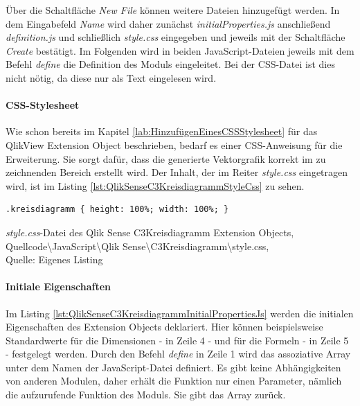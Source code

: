 Über die Schaltfläche \textit{New File} können weitere Dateien hinzugefügt werden. In dem Eingabefeld \textit{Name} wird daher zunächst \textit{initialProperties.js} anschließend \textit{definition.js} und schließlich \textit{style.css} eingegeben und jeweils mit der Schaltfläche \textit{Create} bestätigt. Im Folgenden wird in beiden JavaScript-Dateien jeweils mit dem Befehl \textit{define} die Definition des Moduls eingeleitet. Bei der CSS-Datei ist dies nicht nötig, da diese nur als Text eingelesen wird.

\paragraph{CSS-Stylesheet}

Wie schon bereits im Kapitel \ref{lab:HinzufügenEinesCSSStylesheet} für das QlikView Extension Object beschrieben, bedarf es einer CSS-Anweisung für die Erweiterung. Sie sorgt dafür, dass die generierte Vektorgrafik korrekt im zu zeichnenden Bereich erstellt wird. Der Inhalt, der im Reiter \textit{style.css} eingetragen wird, ist im Listing \ref{lst:QlikSenseC3KreisdiagrammStyleCss} zu sehen.

\begin{listing}[htbp]
\begin{verbatim}
.kreisdiagramm { height: 100%; width: 100%; }
\end{verbatim}
\caption[\textit{style.css}-Datei des Qlik Sense C3Kreisdiagramm Extension Objects]{\textit{style.css}-Datei des Qlik Sense C3Kreisdiagramm Extension Objects, \\Quellcode\textbackslash{}JavaScript\textbackslash{}Qlik Sense\textbackslash{}C3Kreisdiagramm\textbackslash{}style.css, \\Quelle: Eigenes Listing}
\label{lst:QlikSenseC3KreisdiagrammStyleCss}
\end{listing}

\paragraph{Initiale Eigenschaften}

Im Listing \ref{lst:QlikSenseC3KreisdiagrammInitialPropertiesJs} werden die initialen Eigenschaften des Extension Objects deklariert. Hier können beispielsweise Standardwerte für die Dimensionen - in Zeile 4 - und für die Formeln - in Zeile 5 - festgelegt werden. Durch den Befehl \textit{define} in Zeile 1 wird das assoziative Array unter dem Namen der JavaScript-Datei definiert. Es gibt keine Abhängig\-keiten von anderen Modulen, daher erhält die Funktion nur einen Parameter, nämlich die aufzurufende Funktion des Moduls. Sie gibt das Array zurück.

